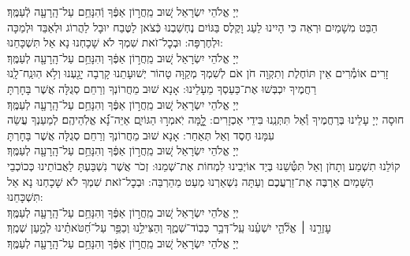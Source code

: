 \documentclass[twoside, openany, parskip=half, 11pt]{book}
\begin{document}
\nefilasapayim \label{nefilas_apayim}

\begin{sometimes}

\setlength{\LTpost}{0pt}

יְיָ אֱלֹהֵי יִשְׂרָאֵל  שׁ֚וּב מֵֽחֲר֣וֹן אַפֶּ֔ךָ וְֿהִנָּחֵ֥ם עַל־הָֽרָעָ֖ה לְֿעַמֶּֽךָ׃\\
הַבֵּט מִשָׁמַיִם וּרְאֵה כִּי הָיִינוּ לַעַג וָקֶלֶס בַּגּוֹיִם נֶחְשַׁבְנוּ כְּֿצֹאן לַטֶּבַח יוּבָל לַהֲרוֹג וּלְאַבֵּד וּלְמַכָּה וּלְחֶרְפָּה: וּבְכׇל־זֹאת שִׁמְךָ לֹא שָׁכָחְנוּ נָא אַל תִּשְׁכָּחֵנוּ:\\
יְיָ אֱלֹהֵי יִשְׂרָאֵל שׁ֚וּב מֵֽחֲר֣וֹן אַפֶּ֔ךָ וְהִנָּחֵ֥ם עַל־הָֽרָעָ֖ה לְעַמֶּֽךָ׃\\
זָרִים אוֹמְ֯רִים אֵין תּוֹחֶלֶת וְתִקְוָה חֹן אֹם לְשִׁמְךָ מְקַוָּה טָהוֹר יְשׁוּעָתֵנוּ קָרְבָה יָגַ֖עְנוּ וְלֹ֥א הֽוּנַֽח־לָֽנוּ רַחֲמֶיךָ יִכְבְּשׁוּ אֶת־כַּעַסְךָ מֵעָלֵינוּ: אָנָא שׁוּב מֵחֲרוֹנְךָ וְרַחֵם סְגֻלָּה אֲשֶׁר בָּחָרְתָּ\\
יְיָ אֱלֹהֵי יִשְׂרָאֵל שׁ֚וּב מֵֽחֲר֣וֹן אַפֶּ֔ךָ וְהִנָּחֵ֥ם עַל־הָֽרָעָ֖ה לְעַמֶּֽךָ׃\\
חוּסָה יְיָ עָלֵינוּ בְּרַחֲמֶיךָ וְ֯אַל תִּתְּנֵֽנוּ בִּידֵי אַכְזָרִים:
לׇׇׇ֭מָּה יֹֽאמְר֣וּ הַגּוֹיִ֑ם אַיֵּה־נָ֝֗א אֱלֹֽהֵיהֶֽם׃
לְמַעַנְךָ עֲשֵׂה עִמָּנוּ חֶסֶד וְאַל תְּאַחַר:
אָנָא שׁוּב מֵחֲרוֹנְךָ וְרַחֵם סְגֻלָּה אֲשֶׁר בָּחָרְתָּ\\
יְיָ אֱלֹהֵי יִשְׂרָאֵל שׁ֚וּב מֵֽחֲר֣וֹן אַפֶּ֔ךָ וְהִנָּחֵ֥ם עַל־הָֽרָעָ֖ה לְעַמֶּֽךָ׃\\
קוֹלֵנוּ תִשְׁמַע וְתָחֹן וְאַל תִּטְּ֯שֵׁנוּ בְּיַד אוֹיְבֵינוּ לִמְחוֹת אֶת־שְׁמֵנוּ:
זְכֹר אֲשֶׁר נִשְׁבַּעְתָּ לַאֲבוֹתֵינוּ כְּכוֹכְבֵי הַשָּׁמַיִם אַרְבֶּה אֶת־זַרְעֲכֶם וְעַתָּה נִשְׁאַרְנוּ מְעַט מֵהַרְבֵּה:
וּבְכׇל־זֹאת שִׁמְךָ לֹא שָׁכָחְנוּ נָא אַל תִּשְׁכָּחֵנוּ:\\
יְיָ אֱלֹהֵי יִשְׂרָאֵל שׁ֚וּב מֵֽחֲר֣וֹן אַפֶּ֔ךָ וְהִנָּחֵ֥ם עַל־הָֽרָעָ֖ה לְעַמֶּֽךָ׃\\
עׇזְרֵ֤נוּ ׀ אֱלֹ֘הֵ֤י יִשְׁעֵ֗נוּ עַֽל־דְּבַ֥ר כְּבֽוֹד־שְׁמֶ֑ךָ וְהַצִּילֵ֥נוּ וְכַפֵּ֥ר עַל־חַ֝טֹּאתֵ֗ינוּ לְמַ֣עַן שְׁמֶֽךָ׃\\
יְיָ אֱלֹהֵי יִשְׂרָאֵל שׁ֚וּב מֵֽחֲר֣וֹן אַפֶּ֔ךָ וְהִנָּחֵ֥ם עַל־הָֽרָעָ֖ה לְעַמֶּֽךָ׃\\


\end{sometimes}
\end{document}
